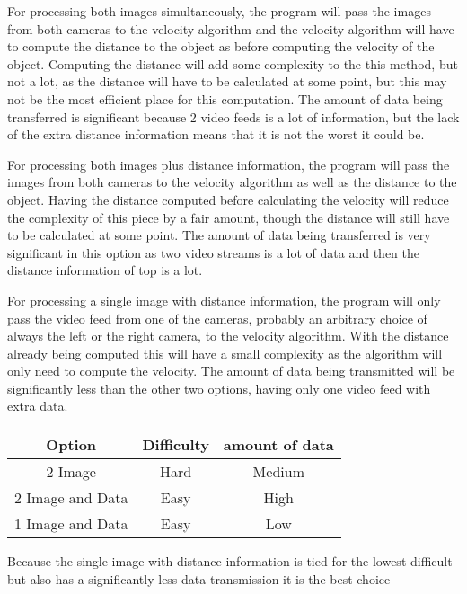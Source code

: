 \documentclass[letterpaper,10pt,onecolumn,draftclsnofoot]{IEEEtran}
\begin{document}
For processing both images simultaneously, the program will pass the images from both cameras to the velocity algorithm and the velocity algorithm will have to compute the distance to the object as before computing the velocity of the object.
Computing the distance will add some complexity to the this method, but not a lot, as the distance will have to be calculated at some point, but this may not be the most efficient place for this computation.
The amount of data being transferred is significant because 2 video feeds is a lot of information, but the lack of the extra distance information means that it is not the worst it could be.

For processing both images plus distance information, the program will pass the images from both cameras to the velocity algorithm as well as the distance to the object.
Having the distance computed before calculating the velocity will reduce the complexity of this piece by a fair amount, though the distance will still have to be calculated at some point.
The amount of data being transferred is very significant in this option as two video streams is a lot of data and then the distance information of top is a lot.

For processing a single image with distance information, the program will only pass the video feed from one of the cameras, probably an arbitrary choice of always the left or the right camera, to the velocity algorithm.
With the distance already being computed this will have a small complexity as the algorithm will only need to compute the velocity.
The amount of data being transmitted will be significantly less than the other two options, having only one video feed with extra data.


\begin{center}
	\begin{tabular}{|c|c|c|}
		\hline
		\textbf{Option} & \textbf{Difficulty} & \textbf{amount of data} \\
		\hline
		2 Image & Hard & Medium \\
		\hline
		2 Image and Data & Easy & High\\
		\hline
		1 Image and Data & Easy & Low \\
		\hline
		
	\end{tabular}
\end{center}


Because the single image with distance information is tied for the lowest difficult but also has a significantly less data transmission it is the best choice
\end{document}
